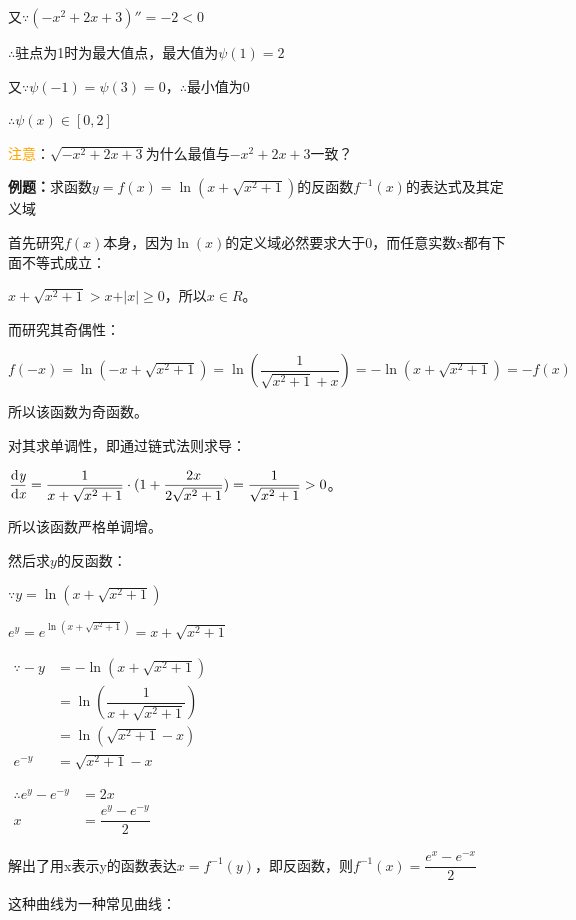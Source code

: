 \documentclass[UTF8, 12pt]{ctexart}
\begin{document}
    又$\because(-x^2+2x+3)''=-2<0$

    $\therefore$驻点为1时为最大值点，最大值为$\psi(1)=2$

    又$\because\psi(-1)=\psi(3)=0$，$\therefore$最小值为0

    $\therefore\psi(x)\in[0,2]$

    \textcolor{orange}{注意}：$\sqrt{-x^2+2x+3}$为什么最值与$-x^2+2x+3$一致？

    \textbf{例题：}求函数$y=f(x)=\ln(x+\sqrt{x^2+1})$的反函数$f^{-1}(x)$的表达式及其定义域

    首先研究$f(x)$本身，因为$\ln(x)$的定义域必然要求大于0，而任意实数x都有下面不等式成立：

    $x+\sqrt{x^2+1}>x+\vert x\vert \geqslant 0$，所以$x\in R$。

    而研究其奇偶性：

    $f(-x)=\ln(-x+\sqrt{x^2+1})=\ln(\dfrac{1}{\sqrt{x^2+1}+x})=-\ln(x+\sqrt{x^2+1})=-f(x)$

    所以该函数为奇函数。

    对其求单调性，即通过链式法则求导：

    $\dfrac{\rm{d}\textit{y}}{\rm{d}\textit{x}}=\dfrac{1}{x+\sqrt{x^2+1}}\cdot (1+\dfrac{2x}{2\sqrt{x^2+1}})=\dfrac{1}{\sqrt{x^2+1}}>0$。\medskip

    所以该函数严格单调增。

    然后求$y$的反函数：

    $\because y=\ln(x+\sqrt{x^2+1})$

    $e^y=e^{\ln(x+\sqrt{x^2+1})}=x+\sqrt{x^2+1}$

    $
    \begin{aligned}
        \because -y & =-\ln(x+\sqrt{x^2+1})          \\
        & =\ln(\dfrac{1}{x+\sqrt{x^2+1}}) \\
        & =\ln(\sqrt{x^2+1}-x)           \\
        e^{-y}      & =\sqrt{x^2+1}-x
    \end{aligned}
    $

    $
    \begin{aligned}
        \therefore e^y-e^{-y} & =2x                   \\
        x                     & =\dfrac{e^y-e^{-y}}{2}
    \end{aligned}
    $

    解出了用x表示y的函数表达$x=f^{-1}(y)$，即反函数，则$f^{-1}(x)=\dfrac{e^x-e^{-x}}{2}$

    这种曲线为一种常见曲线：
\end{document}
